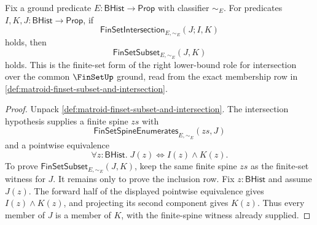 \begin{lemma}
\label{lem:matroid-finset-intersection-right-subset}
Fix a ground predicate $E:\mathsf{BHist}\to\mathsf{Prop}$ with classifier $\sim_E$. For predicates $I,K,J:\mathsf{BHist}\to\mathsf{Prop}$, if
$$
\mathsf{FinSetIntersection}_{E,\sim_E}(J;I,K)
$$
holds, then
$$
\mathsf{FinSetSubset}_{E,\sim_E}(J,K)
$$
holds. This is the finite-set form of the right lower-bound role for intersection over the common $\FinSetUp$ ground, read from the exact membership row in \autoref{def:matroid-finset-subset-and-intersection}.
\end{lemma}
\begin{proof}
Unpack \autoref{def:matroid-finset-subset-and-intersection}. The intersection hypothesis supplies a finite spine $zs$ with
$$
\mathsf{FinSetSpineEnumerates}_{E,\sim_E}(zs,J)
$$
and a pointwise equivalence
$$
\forall z:\mathsf{BHist}.\;J(z)\Longleftrightarrow I(z)\land K(z).
$$
To prove $\mathsf{FinSetSubset}_{E,\sim_E}(J,K)$, keep the same finite spine $zs$ as the finite-set witness for $J$. It remains only to prove the inclusion row. Fix $z:\mathsf{BHist}$ and assume $J(z)$. The forward half of the displayed pointwise equivalence gives $I(z)\land K(z)$, and projecting its second component gives $K(z)$. Thus every member of $J$ is a member of $K$, with the finite-spine witness already supplied.
\end{proof}

